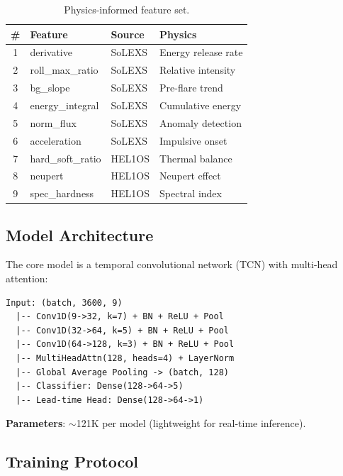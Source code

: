 \documentclass[twocolumn,10pt]{article}
\begin{document}
\begin{table}[htbp]
\centering
\caption{Physics-informed feature set.}
\label{tab:features}
\footnotesize
\begin{tabular}{@{}clp{1.6cm}l@{}}
\toprule
\# & Feature & Source & Physics \\
\midrule
1 & derivative & SoLEXS & Energy release rate \\
2 & roll\_max\_ratio & SoLEXS & Relative intensity \\
3 & bg\_slope & SoLEXS & Pre-flare trend \\
4 & energy\_integral & SoLEXS & Cumulative energy \\
5 & norm\_flux & SoLEXS & Anomaly detection \\
6 & acceleration & SoLEXS & Impulsive onset \\
7 & hard\_soft\_ratio & HEL1OS & Thermal balance \\
8 & neupert & HEL1OS & Neupert effect \\
9 & spec\_hardness & HEL1OS & Spectral index \\
\bottomrule
\end{tabular}
\end{table}

\subsection{Model Architecture}\label{sec:architecture}

The core model is a temporal convolutional network (TCN) with multi-head attention:

\begin{lstlisting}
Input: (batch, 3600, 9)
  |-- Conv1D(9->32, k=7) + BN + ReLU + Pool
  |-- Conv1D(32->64, k=5) + BN + ReLU + Pool
  |-- Conv1D(64->128, k=3) + BN + ReLU + Pool
  |-- MultiHeadAttn(128, heads=4) + LayerNorm
  |-- Global Average Pooling -> (batch, 128)
  |-- Classifier: Dense(128->64->5)
  |-- Lead-time Head: Dense(128->64->1)
\end{lstlisting}

\textbf{Parameters}: $\sim$121K per model (lightweight for real-time inference).

\subsection{Training Protocol}\label{sec:training}
\end{document}
